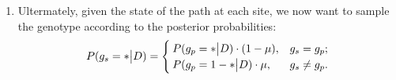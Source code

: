 \documentclass{bioinfo}
\begin{document}
\begin{methods}
\begin{enumerate}
\item Ultermately, given the state of the path at each site, we now want to sample the genotype according to the posterior probabilities:
\begin{equation}
P(g_{s} = * \big{|} D) =
\begin{cases}
P(g_{p} = * \big{|} D) \cdot (1-\mu), & g_s = g_p;\\
P(g_{p} = 1 - * \big{|} D) \cdot \mu, & g_s \neq g_p.
\end{cases}
\label{eqn:ps0}
\end{equation}



\end{enumerate}



\end{methods}
\end{document}
